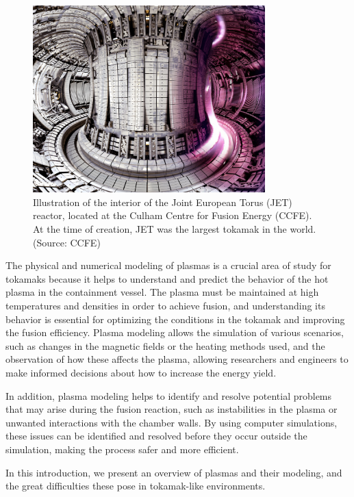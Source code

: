 \documentclass[12pt, a4paper]{article}
\begin{document}
    \begin{figure}[!ht]
        \centering
        \includegraphics[width = 0.8\textwidth]{images/JET.jpg}
        \caption{Illustration of the interior of the Joint European Torus (JET) reactor, located at the Culham Centre for Fusion Energy (CCFE). At the time of creation, JET was the largest tokamak in the world. (Source: CCFE)}
    \end{figure}

    \shortline

    The physical and numerical modeling of plasmas is a crucial area of study for tokamaks because it helps to understand and predict the behavior of the hot plasma in the containment vessel. The plasma must be maintained at high temperatures and densities in order to achieve fusion, and understanding its behavior is essential for optimizing the conditions in the tokamak and improving the fusion efficiency. Plasma modeling allows the simulation of various scenarios, such as changes in the magnetic fields or the heating methods used, and the observation of how these affects the plasma, allowing researchers and engineers to make informed decisions about how to increase the energy yield.
    
    In addition, plasma modeling helps to identify and resolve potential problems that may arise during the fusion reaction, such as instabilities in the plasma or unwanted interactions with the chamber walls. By using computer simulations, these issues can be identified and resolved before they occur outside the simulation, making the process safer and more efficient.
    
    \shortline

    In this introduction, we present an overview of plasmas and their modeling, and the great difficulties these pose in tokamak-like environments.



    
    
    
    
    \newpage
        \printbibliography
    
    
    \newpage
    \appendix
        
\end{document}
